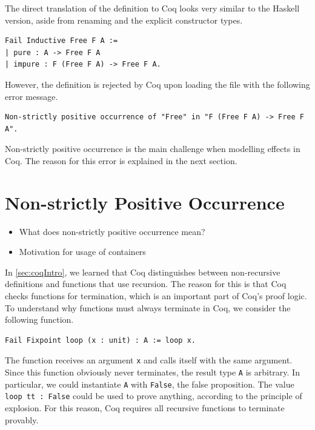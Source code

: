 \documentclass[a4paper, 11pt, fleqn, twoside]{scrreprt}
\begin{document}
The direct translation of the definition to Coq looks very similar to the Haskell version, aside from renaming and the explicit constructor types.

\begin{verbatim}
Fail Inductive Free F A :=
| pure : A -> Free F A
| impure : F (Free F A) -> Free F A.
\end{verbatim}

However, the definition is rejected by Coq upon loading the file with the following error message.

\begin{verbatim}
Non-strictly positive occurrence of "Free" in "F (Free F A) -> Free F A".
\end{verbatim}

Non-strictly positive occurrence is the main challenge when modelling effects in Coq.
The reason for this error is explained in the next section.

\section{Non-strictly Positive Occurrence}
\begin{itemize}
\item What does non-strictly positive occurrence mean?
\item Motivation for usage of containers
\end{itemize}

In \autoref{sec:coqIntro}, we learned that Coq distinguishes between non-recursive definitions and functions that use recursion.
The reason for this is that Coq checks functions for termination, which is an important part of Coq's proof logic.
To understand why functions must always terminate in Coq, we consider the following function.

\begin{verbatim}
Fail Fixpoint loop (x : unit) : A := loop x.
\end{verbatim}

The function receives an argument \texttt{x} and calls itself with the same argument.
Since this function obviously never terminates, the result type \texttt{A} is arbitrary.
In particular, we could instantiate \texttt{A} with \texttt{False}, the false proposition.
The value \texttt{loop tt : False} could be used to prove anything, according to the principle of explosion.
For this reason, Coq requires all recursive functions to terminate provably.
\end{document}
